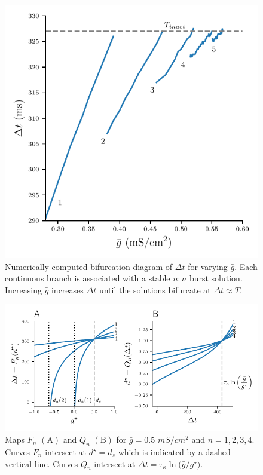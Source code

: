\documentclass[utf8]{frontiersFPHY} %
\newcommand{\gbar}{\bar g}
\newcommand{\delt}{\Delta t}
\begin{document}
\begin{figure}[h!]
  \centering
  \includegraphics{delta-t}
  \caption{Numerically computed bifurcation diagram of $\delt$ for varying $\gbar$.
    Each continuous branch is associated with a stable $n:n$ burst solution. Increasing
    $\gbar$ increases $\Delta t$ until the solutions bifurcate at $\Delta t\approx
    T$.~\label{fig:delta-t}}
\end{figure}

\begin{figure}[h!]
  \centering
  \includegraphics{FQ-maps}
  \caption{Maps $F_n$ $\bm{\mathrm{(A)}}$ and $Q_n$ $\bm{\mathrm{(B)}}$ for
  $\gbar=0.5$ $\si{mS/cm^{2}}$ and $n=1,2,3,4$. Curves $F_n$ intersect at
  $d^{\star}=d_{s}$ which is indicated by a dashed vertical line. Curves $Q_n$ intersect at $\Delta t = \tau_{\kappa}\ln\Big(\bar g / g^{\star}\Big)$. \label{fig:FQ-maps}}
\end{figure}
\end{document}
